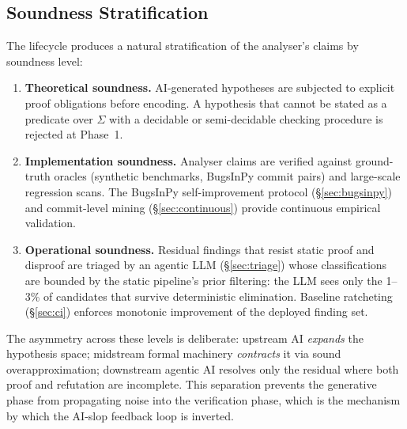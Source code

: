\subsection{Soundness Stratification}

The lifecycle produces a natural stratification of the analyser's claims by soundness level:

\begin{enumerate}
  \item \textbf{Theoretical soundness.}  AI-generated hypotheses are subjected to explicit proof obligations before encoding.  A hypothesis that cannot be stated as a predicate over $\Sigma$ with a decidable or semi-decidable checking procedure is rejected at Phase~1.
  \item \textbf{Implementation soundness.}  Analyser claims are verified against ground-truth oracles (synthetic benchmarks, BugsInPy commit pairs) and large-scale regression scans.  The BugsInPy self-improvement protocol (\S\ref{sec:bugsinpy}) and commit-level mining (\S\ref{sec:continuous}) provide continuous empirical validation.
  \item \textbf{Operational soundness.}  Residual findings that resist static proof and disproof are triaged by an agentic LLM (\S\ref{sec:triage}) whose classifications are bounded by the static pipeline's prior filtering: the LLM sees only the 1--3\% of candidates that survive deterministic elimination.  Baseline ratcheting (\S\ref{sec:ci}) enforces monotonic improvement of the deployed finding set.
\end{enumerate}

The asymmetry across these levels is deliberate: upstream AI \emph{expands} the hypothesis space; midstream formal machinery \emph{contracts} it via sound overapproximation; downstream agentic AI resolves only the residual where both proof and refutation are incomplete.
This separation prevents the generative phase from propagating noise into the verification phase, which is the mechanism by which the AI-slop feedback loop is inverted.
